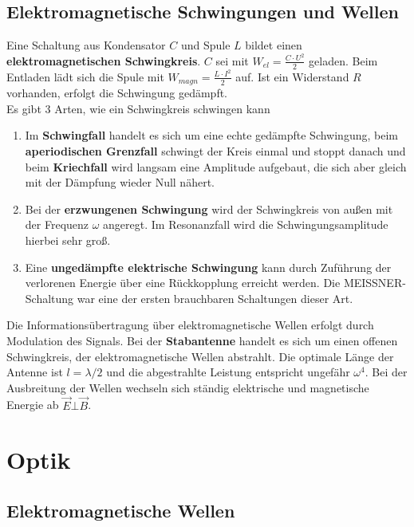 \documentclass[12pt,a4paper,ngerman]{article}
\begin{document}
\pagebreak

\subsection{Elektromagnetische Schwingungen und Wellen}

Eine Schaltung aus Kondensator $C$ und Spule $L$ bildet einen \textbf{elektromagnetischen Schwingkreis}. $C$ sei mit $W_{el} = \frac{C \cdot U^2}{2}$ geladen. Beim Entladen lädt sich die Spule mit $W_{magn} = \frac{L \cdot I^2}{2}$ auf. Ist ein Widerstand $R$ vorhanden, erfolgt die Schwingung gedämpft. \\
Es gibt 3 Arten, wie ein Schwingkreis schwingen kann

\begin{enumerate}
\item Im \textbf{Schwingfall} handelt es sich um eine echte gedämpfte Schwingung, beim \textbf{aperiodischen Grenzfall} schwingt der Kreis einmal und stoppt danach und beim \textbf{Kriechfall} wird langsam eine Amplitude aufgebaut, die sich aber gleich mit der Dämpfung wieder Null nähert. 
\item Bei der \textbf{erzwungenen Schwingung} wird der Schwingkreis von außen mit der Frequenz $\omega$ angeregt. Im Resonanzfall wird die Schwingungsamplitude hierbei sehr groß. \item Eine \textbf{ungedämpfte elektrische Schwingung} kann durch Zuführung der verlorenen Energie über eine Rückkopplung erreicht werden. Die MEISSNER-Schaltung war eine der ersten brauchbaren Schaltungen dieser Art.
\end{enumerate}
Die Informationsübertragung über elektromagnetische Wellen erfolgt durch Modulation des Signals. Bei der \textbf{Stabantenne} handelt es sich um einen offenen Schwingkreis, der elektromagnetische Wellen abstrahlt. Die optimale Länge der Antenne ist $l = \lambda/2$ und die abgestrahlte Leistung entspricht ungefähr $\omega^4$. Bei der Ausbreitung der Wellen wechseln sich ständig elektrische und magnetische Energie ab $\vec{E} \bot \vec{B}$. 

\pagebreak

\section{Optik}
\subsection{Elektromagnetische Wellen}
\end{document}
